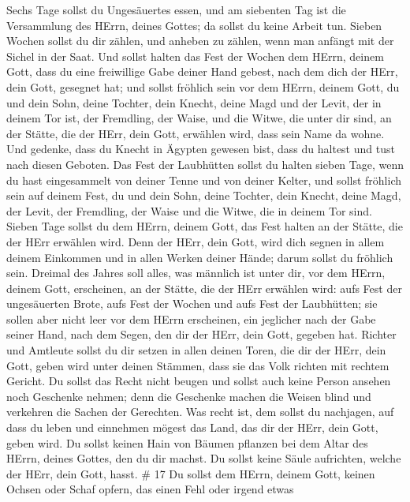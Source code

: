 Sechs Tage sollst du Ungesäuertes essen, und am siebenten Tag ist die
Versammlung des HErrn, deines Gottes; da sollst du keine Arbeit tun.
 Sieben Wochen sollst du dir zählen, und anheben zu zählen,
wenn man anfängt mit der Sichel in der Saat.  Und sollst
halten das Fest der Wochen dem HErrn, deinem Gott, dass du eine
freiwillige Gabe deiner Hand gebest, nach dem dich der HErr, dein Gott,
gesegnet hat;  und sollst fröhlich sein vor dem HErrn,
deinem Gott, du und dein Sohn, deine Tochter, dein Knecht, deine Magd
und der Levit, der in deinem Tor ist, der Fremdling, der Waise, und die
Witwe, die unter dir sind, an der Stätte, die der HErr, dein Gott,
erwählen wird, dass sein Name da wohne.  Und gedenke, dass
du Knecht in Ägypten gewesen bist, dass du haltest und tust nach diesen
Geboten.  Das Fest der Laubhütten sollst du halten sieben
Tage, wenn du hast eingesammelt von deiner Tenne und von deiner Kelter,
 und sollst fröhlich sein auf deinem Fest, du und dein
Sohn, deine Tochter, dein Knecht, deine Magd, der Levit, der Fremdling,
der Waise und die Witwe, die in deinem Tor sind.  Sieben
Tage sollst du dem HErrn, deinem Gott, das Fest halten an der Stätte,
die der HErr erwählen wird. Denn der HErr, dein Gott, wird dich segnen
in allem deinem Einkommen und in allen Werken deiner Hände; darum sollst
du fröhlich sein.  Dreimal des Jahres soll alles, was
männlich ist unter dir, vor dem HErrn, deinem Gott, erscheinen, an der
Stätte, die der HErr erwählen wird: aufs Fest der ungesäuerten Brote,
aufs Fest der Wochen und aufs Fest der Laubhütten; sie sollen aber nicht
leer vor dem HErrn erscheinen,  ein jeglicher nach der Gabe
seiner Hand, nach dem Segen, den dir der HErr, dein Gott, gegeben hat.
 Richter und Amtleute sollst du dir setzen in allen deinen
Toren, die dir der HErr, dein Gott, geben wird unter deinen Stämmen,
dass sie das Volk richten mit rechtem Gericht.  Du sollst
das Recht nicht beugen und sollst auch keine Person ansehen noch
Geschenke nehmen; denn die Geschenke machen die Weisen blind und
verkehren die Sachen der Gerechten.  Was recht ist, dem
sollst du nachjagen, auf dass du leben und einnehmen mögest das Land,
das dir der HErr, dein Gott, geben wird.  Du sollst keinen
Hain von Bäumen pflanzen bei dem Altar des HErrn, deines Gottes, den du
dir machst.  Du sollst keine Säule aufrichten, welche der
HErr, dein Gott, hasst. \# 17  Du sollst dem HErrn, deinem
Gott, keinen Ochsen oder Schaf opfern, das einen Fehl oder irgend etwas
